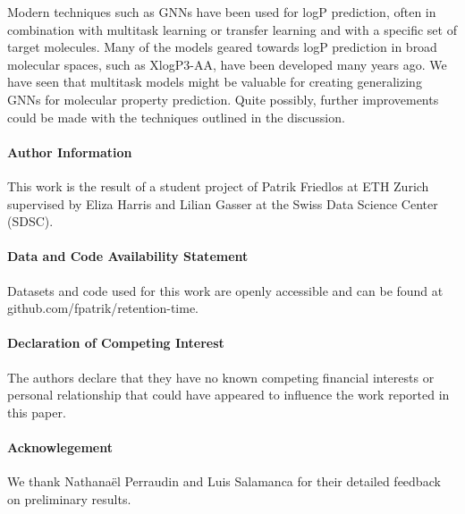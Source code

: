 \documentclass{article}
\begin{document}
Modern techniques such as GNNs have been used for logP prediction, often in combination with multitask learning or transfer learning and with a specific set of target molecules. Many of the models geared towards logP prediction in broad molecular spaces, such as XlogP3-AA, have been developed many years ago. We have seen that multitask models might be valuable for creating generalizing GNNs for molecular property prediction. Quite possibly, further improvements could be made with the techniques outlined in the discussion.

\paragraph{Author Information\\}

This work is the result of a student project of Patrik Friedlos at ETH Zurich supervised by Eliza Harris and Lilian Gasser at the Swiss Data Science Center (SDSC).

\paragraph{Data and Code Availability Statement\\}

Datasets and code used for this work are openly accessible and can be found at github.com/fpatrik/retention-time.

\paragraph{Declaration of Competing Interest\\}

The authors declare that they have no known competing financial interests or personal relationship that could have appeared to influence the work reported in this paper.

\paragraph{Acknowlegement\\}

We thank Nathanaël Perraudin and Luis Salamanca for their detailed feedback on preliminary results.

 

\end{document}
